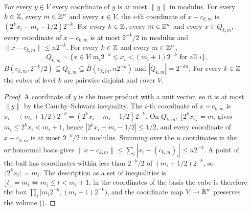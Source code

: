 \begin{lemma}
\label{lem:dyadic-cubes}
\leanok
{}
For every $y \in V$ every coordinate of $y$ is at most $\|y\|$ in modulus. For every $k \in \mathbb{Z}$,
every $m \in \mathbb{Z}^n$ and every $x \in V$, the $i$-th coordinate of
$x - c_{k,m}$ is $(2^k x_i - m_i - 1/2) 2^{-k}$. For every $k \in \mathbb{Z}$, every $m \in \mathbb{Z}^n$ and
every $x \in Q_{k,m}$, every coordinate of $x - c_{k,m}$ is at most $2^{-k}/2$ in modulus and
$\|x - c_{k,m}\| \leq n 2^{-k}$. For every $k \in \mathbb{Z}$ and every $m \in \mathbb{Z}^n$,
\[
  Q_{k,m} = \{x \in V : m_i 2^{-k} \leq x_i < (m_i + 1) 2^{-k} \text{ for all } i\},
\]
$B(c_{k,m}, 2^{-k}/2) \subseteq Q_{k,m} \subseteq \bar B(c_{k,m}, n 2^{-k})$ and
$|Q_{k,m}| = 2^{-kn}$. For every $k \in \mathbb{Z}$ the cubes of level $k$ are pairwise disjoint and
cover $V$.
\end{lemma}

\begin{proof}
\leanok
{}
A coordinate of $y$ is the inner product with a unit vector, so it is at most $\|y\|$ by the
Cauchy--Schwarz inequality. The $i$-th coordinate of $x - c_{k,m}$ is
$x_i - (m_i + 1/2) 2^{-k} = (2^k x_i - m_i - 1/2) 2^{-k}$. On $Q_{k,m}$,
$\lfloor 2^k x_i \rfloor = m_i$ gives $m_i \leq 2^k x_i < m_i + 1$, hence
$|2^k x_i - m_i - 1/2| \leq 1/2$, and every coordinate of $x - c_{k,m}$ is at most $2^{-k}/2$ in
modulus. Summing over the $n$ coordinates in the orthonormal basis gives
$\|x - c_{k,m}\| \leq \sum_i |x_i - (c_{k,m})_i| \leq n 2^{-k}$. A point of
the ball has coordinates within less than $2^{-k}/2$ of $(m_i + 1/2) 2^{-k}$, so
$\lfloor 2^k x_i \rfloor = m_i$. The description as a set of inequalities is
$\lfloor t \rfloor = m_i \iff m_i \leq t < m_i + 1$; in the coordinates of the basis the cube is
therefore the box $\prod_i [m_i 2^{-k}, (m_i + 1) 2^{-k})$, and the coordinate map $V \to \mathbb{R}^n$
preserves the volume ().
\end{proof}

